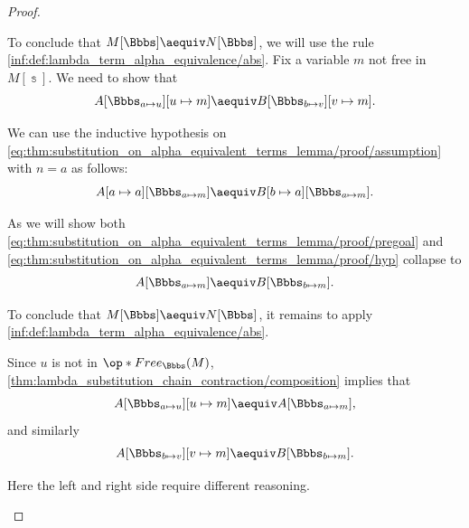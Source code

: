 \begin{proof}
\begin{itemize}
    To conclude that \( M[\Bbbs] \aequiv N[\Bbbs] \), we will use the rule \ref{inf:def:lambda_term_alpha_equivalence/abs}. Fix a variable \( m \) not free in \( M[\Bbbs] \). We need to show that
    \begin{equation}\label{eq:thm:substitution_on_alpha_equivalent_terms_lemma/proof/pregoal}
      A[\Bbbs_{a \mapsto u}][u \mapsto m] \aequiv B[\Bbbs_{b \mapsto v}][v \mapsto m].
    \end{equation}

    We can use the inductive hypothesis on \eqref{eq:thm:substitution_on_alpha_equivalent_terms_lemma/proof/assumption} with \( n = a \) as follows:
    \begin{equation}\label{eq:thm:substitution_on_alpha_equivalent_terms_lemma/proof/hyp}
      A[a \mapsto a][\Bbbs_{a \mapsto m}] \aequiv B[b \mapsto a][\Bbbs_{a \mapsto m}].
    \end{equation}

    As we will show both \eqref{eq:thm:substitution_on_alpha_equivalent_terms_lemma/proof/pregoal} and \eqref{eq:thm:substitution_on_alpha_equivalent_terms_lemma/proof/hyp} collapse to
    \begin{equation}\label{eq:thm:substitution_on_alpha_equivalent_terms_lemma/proof/goal}
      A[\Bbbs_{a \mapsto m}] \aequiv B[\Bbbs_{b \mapsto m}].
    \end{equation}

    To conclude that \( M[\Bbbs] \aequiv N[\Bbbs] \), it remains to apply \ref{inf:def:lambda_term_alpha_equivalence/abs}.

     Since \( u \) is not in \( \op*{Free}_\Bbbs(M) \), \cref{thm:lambda_substitution_chain_contraction/composition} implies that
    \begin{equation*}
      A[\Bbbs_{a \mapsto u}][u \mapsto m] \aequiv A[\Bbbs_{a \mapsto m}],
    \end{equation*}
    and similarly
    \begin{equation*}
      A[\Bbbs_{b \mapsto v}][v \mapsto m] \aequiv B[\Bbbs_{b \mapsto m}].
    \end{equation*}

     Here the left and right side require different reasoning.


\end{itemize}
\end{proof}

